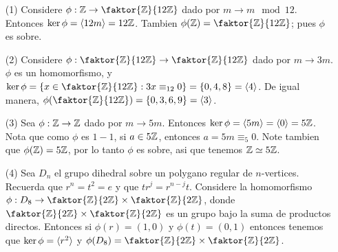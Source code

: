 \begin{example}\label{}
    \begin{enumerate}
        \item[(1)] Considere $\phi:\Z \rightarrow \faktor{\Z}{12\Z}$ dado por $m
            \rightarrow m \mod{12}$. Entonces $\ker{\phi}=\langle 12m\rangle=12\mathbb{Z}$.
            Tambien $\phi(\Z)=\faktor{\Z}{12\Z}$; pues $\phi$ es sobre.

        \item[(2)] Considere $\phi:\faktor{\Z}{12\Z} \rightarrow
            \faktor{\Z}{12\Z}$ dado por $m \rightarrow 3m$. $\phi$ es un
            homomorfismo, y $\ker{\phi}=\{x \in \faktor{\Z}{12\Z} : 3x \equiv_{12}
            0\}=\{0,4,8\}=\vbrack{4}$. De igual manera,
            $\phi(\faktor{\Z}{12\Z})=\{0,3,6,9\}=\vbrack{3}$.

        \item[(3)] Sea $\phi:\mathbb{Z} \rightarrow \mathbb{Z}$ dado por $m \rightarrow 5m$.
            Entonces $\ker{\phi}=\langle 5m\rangle=\langle 0\rangle=5\mathbb{Z}$. Nota que como $\phi$
            es  $1-1$, si $a \in 5\mathbb{Z}$, entonces  $a=5m \equiv_5 0$. Note tambien
            que $\phi(\mathbb{Z})=5\mathbb{Z}$, por lo tanto $\phi$ es sobre, asi que tenemos
            $\mathbb{Z} \simeq 5\mathbb{Z}$.

        \item[(4)] Sea $D_n$ el grupo dihedral sobre un polygano regular de
            $n$-vertices. Recuerda que  $r^n=t^2=e$ y que  $tr^j=r^{n-j}t$.
            Considere la homomorfismo $\phi:D_8 \rightarrow \faktor{\Z}{2\Z}
            \times \faktor{\Z}{2\Z}$, donde $\faktor{\Z}{2\Z} \times
            \faktor{\Z}{2\Z}$ es un grupo bajo la suma de productos directos.
            Entonces si  $\phi(r)=(1,0)$ y $\phi(t)=(0,1)$ entonces tenemos que
            $\ker{\phi}=\langle r^2\rangle$ y $\phi(D_8)=\faktor{\Z}{2\Z} \times
            \faktor{\Z}{2\Z}$.
    \end{enumerate}
\end{example}
